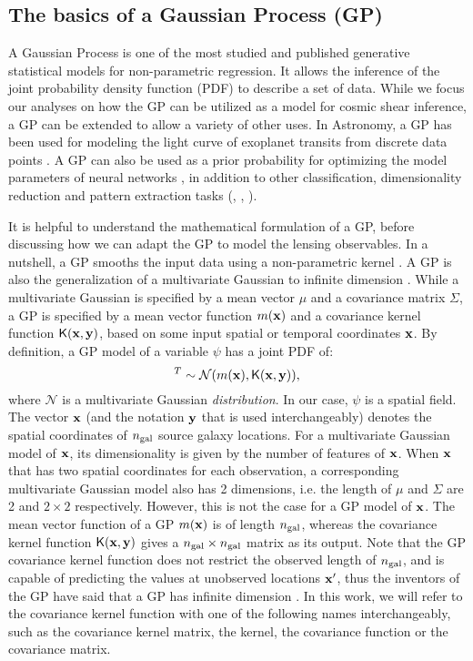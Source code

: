 \subsection{The basics of a Gaussian Process (GP)}
A Gaussian Process is one of the most studied and published 
generative statistical models for non-parametric regression. 
It allows the inference of the joint probability density 
function (PDF) to describe a set of data. 
While we focus our analyses on how the GP can be utilized as a model 
for cosmic shear inference, a GP can be extended to 
allow a variety of other uses. In Astronomy, a GP has been used for modeling 
the light curve of exoplanet transits from discrete data points
\citep{Ambikasaran2014a}. 
A GP can also be used as a prior probability for optimizing the 
model parameters of neural networks \citep{Snoek2012}, in addition to 
other classification, dimensionality reduction 
and pattern extraction tasks
(\citealt{Wilson2013}, \citealt{Duvenaud2013}, \citealt{Rasmussen2006}).
 
It is helpful to understand the mathematical formulation of a GP, 
before discussing how we can adapt the GP to model the lensing observables. 
In a nutshell, a GP smooths the input data using a non-parametric kernel
\citep{Hastie1990}. 
A GP is also the generalization of a multivariate Gaussian 
to infinite dimension \citep{Rasmussen2006}. While a multivariate Gaussian is
specified by a mean vector $\mu$ and a covariance matrix $\Sigma$, 
a GP is specified by a mean vector function $m(\mathbf{x})$ and a
covariance kernel function $\mathsf{K}(\mathbf{x}, \mathbf{y})$, based on some input spatial or
temporal coordinates $\mathbf{x}$. 
By definition, a GP model of a variable $\psi$ has a joint
PDF of:
\begin{equation}
	[\psi_1, \psi_2, \ldots, \psi_m ]^T \sim \mathcal{N}(m(\xv),
	\kerngp(\xv, \yv)),\label{eq:GP_joint_distribution}
\end{equation}
where $\mathcal{N}$ is a multivariate Gaussian {\it distribution}.
In our case, $\psi$ is a spatial field. The vector $\mathbf{x}$ (and the
notation $\mathbf{y}$ that is used interchangeably) denotes the
spatial coordinates of $n_{\rm gal}$ source galaxy locations. 
For a multivariate Gaussian model of $\mathbf{x}$, 
its dimensionality is given by the number of features of $\mathbf{x}$.
When $\mathbf{x}$ that has two spatial coordinates for each observation, 
a corresponding multivariate Gaussian model also has 2 dimensions, 
i.e. the length of $\mu$ and $\Sigma$ are 2 and $2 \times 2$ respectively. 
However, this is not the case for a GP model of $\mathbf{x}$. 
The mean vector function of a GP $m(\mathbf{x})$ is of length $n_{\rm gal}$, 
whereas the covariance kernel function $\mathsf{K}(\mathbf{x}, \mathbf{y})$
gives a $n_{\rm gal} \times n_{\rm gal}$ matrix as its output.
Note that the GP covariance kernel function does not restrict the 
observed length of $n_{\rm gal}$, and is capable of predicting the values at
unobserved locations $\mathbf{x}'$, thus the inventors of the GP 
have said that a GP has infinite dimension \citep{Rasmussen2006}. 
In this work, we will refer to the covariance kernel function with one of 
the following names interchangeably, such as the 
covariance kernel matrix, the kernel, the covariance
function or the covariance matrix. 


